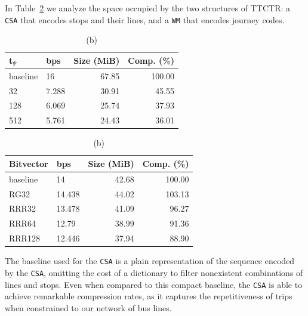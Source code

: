 \documentclass[runningheads]{llncs}
\newcommand{\ttctr}{TTCTR}
\begin{document}
In Table~\ref{tab:ttctr} we analyze the space occupied by the two structures of \ttctr: a \texttt{CSA} that encodes stops and their lines, and a \texttt{WM} that encodes journey codes.

\begin{table}
    \caption{Space requirements for the \texttt{CSA} (a) and the \texttt{WM} (b) from \ttctr}
    \label{tab:ttctr}
    \begin{subtable}[t]{.48\linewidth}
    \vspace{-12pt}
    \caption{\footnotesize (a)}
    \vspace{-12pt}
    \begin{tabular}[t]{|l|l|r|r|}
        \hline
        t$_\Psi$ & bps & Size (MiB) & Comp. (\%) \\
         \hline
        baseline & 16 & 67.85 & 100.00 \\
        32 & 7.288 & 30.91 & 45.55 \\
        128 & 6.069 & 25.74 & 37.93 \\
        512 & 5.761 & 24.43 & 36.01 \\
        \hline
    \end{tabular}
    \end{subtable}%
    \begin{subtable}[t]{.48\linewidth}
    \vspace{-12pt}
    \caption{\footnotesize (b)}
    \vspace{-12pt}
    \begin{tabular}[t]{|l|l|r|r|}
        \hline
        Bitvector & bps & Size (MiB) & Comp. (\%) \\
         \hline
        baseline & 14 & 42.68 & 100.00 \\
        RG32 & 14.438 & 44.02 & 103.13 \\
        RRR32 & 13.478 & 41.09 & 96.27 \\
        RRR64 & 12.79 & 38.99 & 91.36 \\
        RRR128 & 12.446 & 37.94 & 88.90 \\
        \hline
    \end{tabular}
    \end{subtable}
\end{table}

The baseline used for the \texttt{CSA} is a plain representation of the sequence encoded by the \texttt{CSA}, omitting the cost of a dictionary to filter nonexistent combinations of lines and stops. Even when compared to this compact baseline, the \texttt{CSA} is able to achieve remarkable compression rates, as it captures the repetitiveness of trips when constrained to our network of bus lines.
\end{document}
